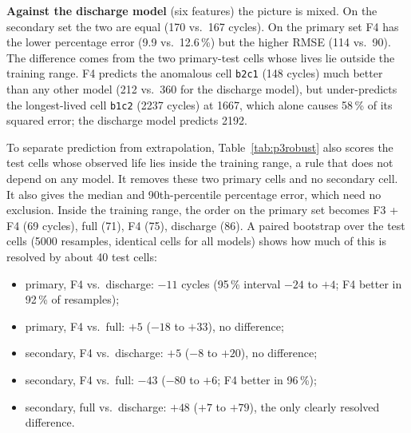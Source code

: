 \textbf{Against the discharge model} (six features) the picture is mixed.
On the secondary set the two are equal (170 vs.\ 167 cycles). On the primary
set F4 has the lower percentage error (9.9 vs.\ 12.6\,\%) but the higher RMSE
(114 vs.\ 90). The difference comes from the two primary-test cells whose
lives lie outside the training range. F4 predicts the anomalous cell
\texttt{b2c1} (148 cycles) much better than any other model (212 vs.\ 360 for
the discharge model), but under-predicts the longest-lived cell \texttt{b1c2}
(2237 cycles) at 1667, which alone causes 58\,\% of its squared error; the
discharge model predicts 2192.

To separate prediction from extrapolation, Table~\ref{tab:p3robust} also
scores the test cells whose observed life lies inside the training range, a
rule that does not depend on any model. It removes these two primary cells
and no secondary cell. It also gives the median and 90th-percentile
percentage error, which need no exclusion. Inside the training range, the
order on the primary set becomes F3 + F4 (69 cycles), full (71), F4 (75),
discharge (86).
A paired bootstrap over the test cells (5000 resamples, identical cells for
all models) shows how much of this is resolved by about 40 test cells:
\begin{itemize}
  \item primary, F4 vs.\ discharge: $-11$ cycles (95\,\% interval $-24$ to
  $+4$; F4 better in 92\,\% of resamples);
  \item primary, F4 vs.\ full: $+5$ ($-18$ to $+33$), no difference;
  \item secondary, F4 vs.\ discharge: $+5$ ($-8$ to $+20$), no difference;
  \item secondary, F4 vs.\ full: $-43$ ($-80$ to $+6$; F4 better in 96\,\%);
  \item secondary, full vs.\ discharge: $+48$ ($+7$ to $+79$), the only
  clearly resolved difference.
\end{itemize}

